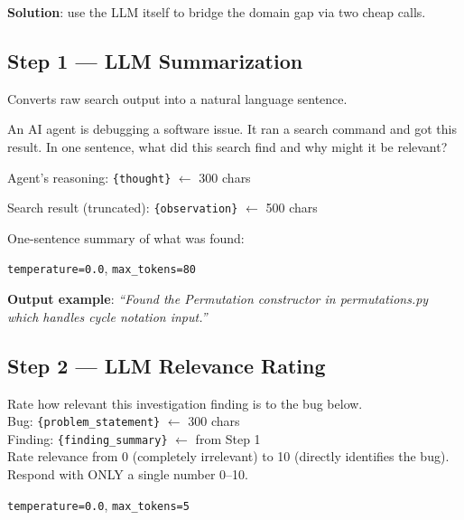 \documentclass[10pt,a4paper,twocolumn]{article}
\begin{document}
\textbf{Solution}: use the LLM itself to bridge the domain gap via two cheap calls.

\subsection{Step 1 --- LLM Summarization}

Converts raw search output into a natural language sentence.

\begin{promptbox}[title=Summarization Prompt]
\scriptsize
An AI agent is debugging a software issue. It ran a search command and got this result. In one sentence, what did this search find and why might it be relevant?

\medskip
Agent's reasoning: \texttt{\{thought\}} {\color{gray}$\leftarrow$ 300 chars}

Search result (truncated): \texttt{\{observation\}} {\color{gray}$\leftarrow$ 500 chars}

One-sentence summary of what was found:
\end{promptbox}

\begin{small}
\texttt{temperature=0.0}, \texttt{max\_tokens=80}
\end{small}

\textbf{Output example}: {\small\emph{``Found the Permutation constructor in permutations.py which handles cycle notation input.''}}

\subsection{Step 2 --- LLM Relevance Rating}

\begin{promptbox}[title=Relevance Prompt]
\scriptsize
Rate how relevant this investigation finding is to the bug below.\\
Bug: \texttt{\{problem\_statement\}} {\color{gray}$\leftarrow$ 300 chars}\\
Finding: \texttt{\{finding\_summary\}} {\color{gray}$\leftarrow$ from Step 1}\\
Rate relevance from 0 (completely irrelevant) to 10 (directly identifies the bug).\\
Respond with ONLY a single number 0--10.
\end{promptbox}

\begin{small}
\texttt{temperature=0.0}, \texttt{max\_tokens=5}
\end{small}
\end{document}
